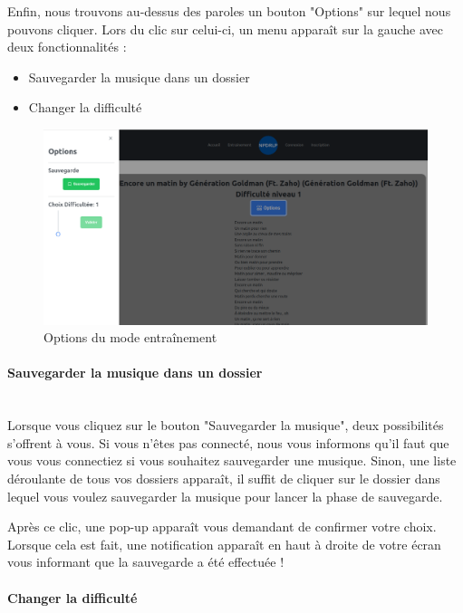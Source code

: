 \documentclass[12pt,french]{article}
\begin{document}
Enfin, nous trouvons au-dessus des paroles un bouton "Options" sur lequel nous pouvons cliquer. Lors du clic sur celui-ci, un menu apparaît sur la gauche avec deux fonctionnalités :

\begin{itemize}
	\item Sauvegarder la musique dans un dossier
	\item Changer la difficulté
\end{itemize}

\bigskip

\begin{figure}[H]
	\centering
	\includegraphics[scale=0.25]{optionparole.png}
	\caption{Options du mode entraînement}
\end{figure}

\paragraph{Sauvegarder la musique dans un dossier \\\\}

Lorsque vous cliquez sur le bouton "Sauvegarder la musique", deux possibilités s'offrent à vous. Si vous n'êtes pas connecté, nous vous informons qu'il faut que vous vous connectiez si vous souhaitez sauvegarder une musique. Sinon, une liste déroulante de tous vos dossiers apparaît, il suffit de cliquer sur le dossier dans lequel vous voulez sauvegarder la musique pour lancer la phase de sauvegarde.

Après ce clic, une pop-up apparaît vous demandant de confirmer votre choix. Lorsque cela est fait, une notification apparaît en haut à droite de votre écran vous informant que la sauvegarde a été effectuée !

\paragraph{Changer la difficulté \\\\}
\end{document}
